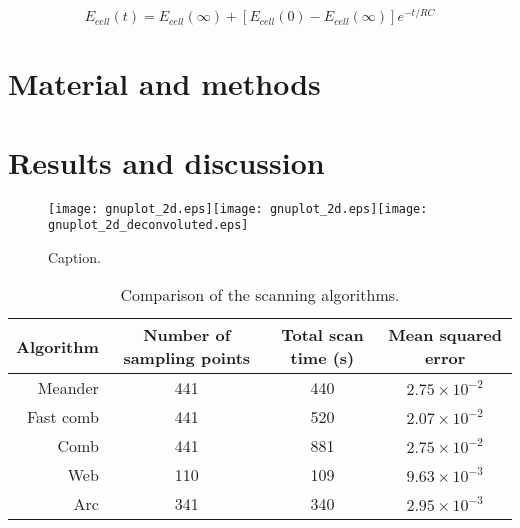 \documentclass[3p]{elsarticle}
\begin{document}
\begin{equation}
\label{eq:rc}
	E_{cell}(t) = E_{cell}(\infty) + [E_{cell}(0) - E_{cell}(\infty)]e^{-t/RC}
\end{equation}

\section{Material and methods}
\section{Results and discussion}

\def\s{0.25}
\begin{figure}
\centering
\texttt{[image: gnuplot\_2d.eps]}\texttt{[image: gnuplot\_2d.eps]}\texttt{[image: gnuplot\_2d\_deconvoluted.eps]}
\caption{Caption.}
\label{fig:label1}
\end{figure}

\begin{table}
                \caption{Comparison of the scanning algorithms.}
                \label{table:comp}
                \centering
                \begin{tabular}{r c c c}
                        Algorithm & Number of sampling points & Total scan time (s) & Mean squared error \\
                        \hline
                        Meander & 441 & 440 & $2.75\times 10^{-2}$ \\
                        Fast comb & 441 & 520  & $2.07\times 10^{-2}$ \\
                        Comb & 441 & 881 & $2.75\times 10^{-2}$ \\
                        Web & 110 & 109 & $9.63\times 10^{-3}$ \\
                        Arc & 341 & 340 & $2.95\times 10^{-3}$ \\

                \end{tabular}

\end{table}
\end{document}
